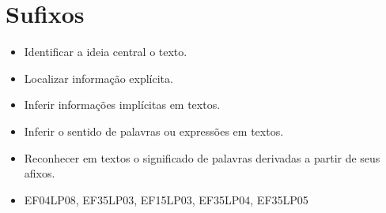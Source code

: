 \chapter{Sufixos}




\begin{itemize}
\item Identificar a ideia central o texto.

\item Localizar informação explícita.

\item Inferir informações implícitas em textos.

\item Inferir o sentido de palavras ou expressões em textos.

\item Reconhecer em textos o significado de palavras derivadas a partir de seus afixos.
\end{itemize}


\begin{itemize}
	\item 
EF04LP08, EF35LP03, EF15LP03, EF35LP04, EF35LP05
\end{itemize}

